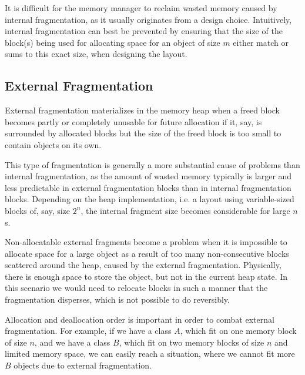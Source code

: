 It is difficult for the memory manager to reclaim wasted memory caused by internal fragmentation, as it usually originates from a design choice.
Intuitively, internal fragmentation can best be prevented by ensuring that the size of the block(s) being used for allocating space for an object of size $m$ either match or sums to this exact size, when designing the layout. 

\subsection{External Fragmentation}
\label{subsec:external-fragmentation}
External fragmentation materializes in the memory heap when a freed block becomes partly or completely unusable for future allocation if it, say, is surrounded by allocated blocks but the size of the freed block is too small to contain objects on its own.

This type of fragmentation is generally a more substantial cause of problems than internal fragmentation, as the amount of wasted memory typically is larger and less predictable in external fragmentation blocks than in internal fragmentation blocks. Depending on the heap implementation, i.e. a layout using variable-sized blocks of, say, size $2^n$, the internal fragment size becomes considerable for large $n$s. 

Non-allocatable external fragments become a problem when it is impossible to allocate space for a large object as a result of too many non-consecutive blocks scattered around the heap, caused by the external fragmentation. Physically, there is enough space to store the object, but not in the current heap state. In this scenario we would need to relocate blocks in such a manner that the fragmentation disperses, which is not possible to do reversibly.

Allocation and deallocation order is important in order to combat external fragmentation. For example, if we have a class $A$, which fit on one memory block of size $n$, and we have a class $B$, which fit on two memory blocks of size $n$ and limited memory space, we can easily reach a situation, where we cannot fit more $B$ objects due to external fragmentation.

